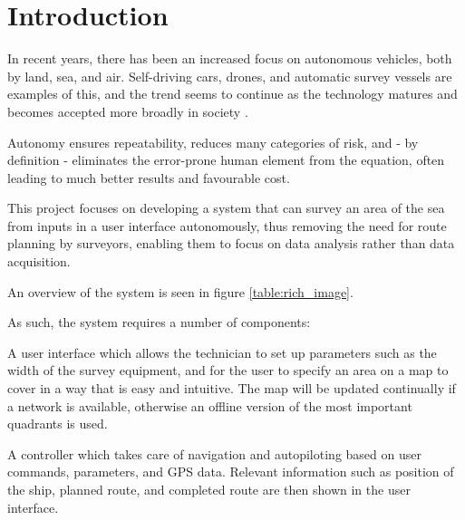 \chapter{Introduction}
In recent years, there has been an increased focus on autonomous vehicles, both by land, sea, and air. Self-driving cars, drones, and automatic survey vessels are examples of this, and the trend seems to continue as the technology matures and becomes accepted more broadly in society \cite{SD_cars}\cite{UAVs}\cite{USVs}.

Autonomy ensures repeatability, reduces many categories of risk, and - by definition - eliminates the error-prone human element from the equation, often leading to much better results and favourable cost. 

This project focuses on developing a system that can survey an area of the sea from inputs in a user interface autonomously, thus removing the need for route planning by surveyors, enabling them to focus on data analysis rather than data acquisition. 

An overview of the system is seen in figure \ref{table:rich_image}.

\noindent As such, the system requires a number of components:

A user interface which allows the technician to set up parameters such as the width of the survey equipment, and for the user to specify an area on a map to cover in a way that is easy and intuitive. The map will be updated continually if a network is available, otherwise an offline version of the most important quadrants is used.

A controller which takes care of navigation and autopiloting based on user commands, parameters, and GPS data. Relevant information such as position of the ship, planned route, and completed route are then shown in the user interface.

